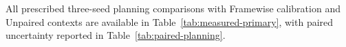 All prescribed three-seed planning comparisons with Framewise calibration and Unpaired contexts are available in Table~\ref{tab:measured-primary}, with paired uncertainty reported in Table~\ref{tab:paired-planning}.
